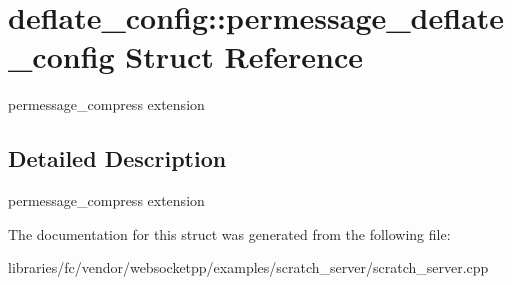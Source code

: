\hypertarget{structdeflate__config_1_1permessage__deflate__config}{}\section{deflate\+\_\+config\+:\+:permessage\+\_\+deflate\+\_\+config Struct Reference}
\label{structdeflate__config_1_1permessage__deflate__config}


permessage\+\_\+compress extension  




\subsection{Detailed Description}
permessage\+\_\+compress extension 

The documentation for this struct was generated from the following file\+:\begin{DoxyCompactItemize}
\item 
libraries/fc/vendor/websocketpp/examples/scratch\+\_\+server/scratch\+\_\+server.\+cpp\end{DoxyCompactItemize}
